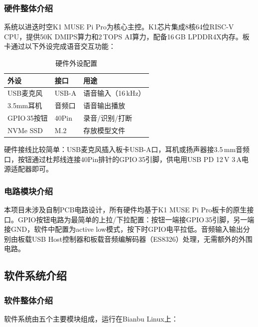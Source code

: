 \documentclass[lettersize,journal]{IEEEtran}
\begin{document}
\subsubsection{硬件整体介绍}

系统以进迭时空K1 MUSE Pi Pro为核心主控。K1芯片集成8核64位RISC-V CPU，提供50K DMIPS算力和2\,TOPS AI算力，配备16\,GB LPDDR4X内存。板卡通过以下外设完成语音交互功能：

\begin{table}[H]
    \centering
    \caption{硬件外设配置}
    \label{tab:hw}
    \footnotesize
    \begin{tabular}{lll}
        \toprule
        \textbf{外设} & \textbf{接口} & \textbf{用途} \\
        \midrule
        USB麦克风 & USB-A & 语音输入（16\,kHz） \\
        3.5mm耳机 & 音频口 & 语音输出播放 \\
        GPIO\,35按钮 & 40Pin & 录音/识别/打断 \\
        NVMe SSD & M.2 & 存放模型文件 \\
        \bottomrule
    \end{tabular}
\end{table}

硬件接线比较简单：USB麦克风插入板卡USB-A口，耳机或扬声器接3.5\,mm音频口，按钮通过杜邦线连接40Pin排针的GPIO\,35引脚，供电用USB PD 12\,V 3\,A电源适配器即可。

\subsubsection{电路模块介绍}

本项目未涉及自制PCB电路设计，所有硬件均基于K1 MUSE Pi Pro板卡的原生接口。GPIO按钮电路为最简单的上拉/下拉配置：按钮一端接GPIO\,35引脚，另一端接GND，软件中配置为active low模式，按下时GPIO电平拉低。音频输入输出分别由板载USB Host控制器和板载音频编解码器（ES8326）处理，无需额外的外围电路。

\subsection{软件系统介绍}

\subsubsection{软件整体介绍}

软件系统由五个主要模块组成，运行在Bianbu Linux上：
\end{document}
